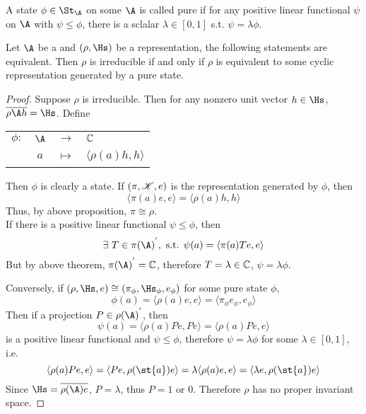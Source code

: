 \begin{defn}
	A state $\phi \in \St_{\A}$ on some \Cs $\A$ is called pure if for any positive linear functional $\psi$ on $\A$ with $\psi \leqslant \phi$, there is a sclalar $\lambda \in [0,1]$ s.t. $\psi = \lambda \phi$.
\end{defn}

\begin{thm}
	Let $\A$ be a \Cs and $(\rho,\Hs)$ be a representation, the following statements are equivalent. Then $\rho$ is irreducible if and only if $\rho$ is equivalent to some cyclic representation generated by a pure state.
\end{thm}
\begin{proof}
	Suppose $\rho$ is irreducible. Then for any nonzero unit vector $h \in \Hs$, $\clo{\rho{\A}h} = \Hs$. Define 
	\begin{center}
		\begin{tabular}{l c c l}
			$\phi \colon$ & $\A$ & $\longrightarrow$ & $\mathbb{C}$ \\
			~ & $a$ & $\longmapsto$ & $\langle \rho(a)h,h \rangle$
		\end{tabular}
	\end{center}
	Then $\phi$ is clearly a state. If $(\pi,\mathscr{K},e)$ is the representation generated by $\phi$, then
	\begin{equation*}
		\langle \pi(a)e,e \rangle = \langle \rho(a)h,h \rangle
	\end{equation*}
	Thus, by above proposition, $\pi \cong \rho$. \\
	If there is a positive linear functional $\psi \leqslant \phi$, then
	\begin{equation*}
		\exists~ T \in {\pi(\A)}^{'},\text{ s.t. } \psi(a) = \langle \pi(a)Te,e \rangle
	\end{equation*}
	But by above theorem, ${\pi(\A)}^{'} = \C$, therefore $T = \lambda \in \mathbb{C}$, $\psi = \lambda \phi$.
	\item Conversely, if $(\rho,\Hs,e) \cong (\pi_{\phi}, \Hs_{\phi},e_{\phi})$ for some pure state $\phi$, 
	\begin{equation*}
		\phi(a) = \langle \rho(a)e, e \rangle =\langle \pi_{\phi}e_{\phi}, e_{\phi} \rangle
	\end{equation*}
	Then if a projection $P \in {\rho(\A)}^{'}$, then
	\begin{equation*}
		\psi(a) = \langle \rho(a)Pe, Pe \rangle = \langle \rho(a)Pe, e \rangle
	\end{equation*}
	is a positive linear functional and $\psi \leqslant \phi$, therefore $\psi = \lambda \phi$ for some $\lambda \in [0,1]$, i.e.
	\begin{equation*}
		\langle \rho(a)Pe, e \rangle = \langle Pe, \rho(\st{a})e \rangle =\lambda\langle \rho(a)e, e \rangle = \langle \lambda e, \rho(\st{a})e \rangle
	\end{equation*}
	Since $\Hs = \clo{\rho(\A)e}$, $P = \lambda$, thus $P=1$ or $0$. Therefore $\rho$ has no proper invariant space.
\end{proof} 


























